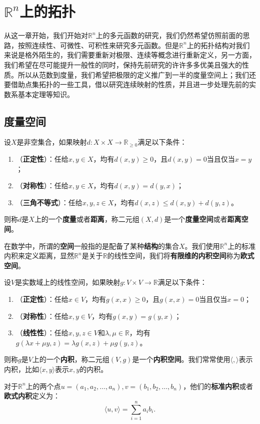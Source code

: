 \chapter{\(\mathbb{R}^n\)上的拓扑}
从这一章开始，我们开始对\(\mathbb{R}^n\)上的多元函数的研究，我们仍然希望仿照前面的思路，按照连续性、可微性、可积性来研究多元函数。但是\(\mathbb{R}^n\)上的拓扑结构对我们来说是格外陌生的，我们需要重新对极限、连续等概念进行重新定义，另一方面，我们希望在尽可能提升一般性的同时，保持先前研究的许许多多优美且强大的性质。所以从范数到度量，我们希望把极限的定义推广到一半的度量空间上；我们还要借助点集拓扑的一些工具，借以研究连续映射的性质，并且进一步处理先前的实数系基本定理等知识。

\section{度量空间}
\begin{definition}[度量]
    设\(X\)是非空集合，如果映射\(d:X\times X\rightarrow\mathbb{R}_{\geqslant0}\)满足以下条件：
    \begin{enumerate}
        \item （\textbf{正定性}）：任给\(x,y\in X\)，均有\(d(x,y)\geq 0\)，且\(d(x,y)=0\)当且仅当\(x=y\)；
        \item （\textbf{对称性}）：任给\(x,y\in X\)，均有\(d(x,y)=d(y,x)\)；
        \item （\textbf{三角不等式}）：任给\(x,y,z\in X\)，均有\(d(x,z)\leq d(x,y)+d(y,z)\)。
    \end{enumerate}
    则称\(d\)是\(X\)上的一个\textbf{度量}或者\textbf{距离}，称二元组\((X,d)\)是一个\textbf{度量空间}或者\textbf{距离空间}。
\end{definition}
在数学中，所谓的\textbf{空间}一般指的是配备了某种\textbf{结构}的集合\(X\)。我们使用\(\mathbb{R}^n\)上的标准内积来定义距离，显然\(\mathbb{R}^n\)是关于\(\mathbb{R}\)的线性空间，我们将\textbf{有限维的内积空间}称为\textbf{欧式空间}。
\begin{definition}[内积]
    设\(V\)是实数域上的线性空间，如果映射\(g:V\times V\rightarrow\mathbb{R}\)满足以下条件：
    \begin{enumerate}
        \item （\textbf{正定性}）：任给\(x\in V\)，均有\(g(x,x)\geq 0\)，且\(g(x,x)=0\)当且仅当\(x=0\)；
        \item （\textbf{对称性}）：任给\(x,y\in V\)，均有\(g(x,y)=g(y,x)\)；
        \item （\textbf{线性性}）：任给\(x,y,z\in V\)和\(\lambda,\mu\in\mathbb{R}\)，均有\(g(\lambda x+\mu y,z)=\lambda g(x,z)+\mu g(y,z)\)。
    \end{enumerate}
    则称\(g\)是\(V\)上的一个\textbf{内积}，称二元组\((V,g)\)是一个\textbf{内积空间}。我们常常使用\(\langle,\rangle\)表示内积，比如\(\langle x,y\rangle\)表示\(x,y\)的内积。

    对于\(\mathbb{R}^n\)上的两个点\(u=(a_1,a_2,\dots,a_n),v=(b_1,b_2,\dots,b_n)\)，他们的\textbf{标准内积}或者\textbf{欧式内积}定义为：\[\langle u,v\rangle= \sum_{i=1}^{n}a_ib_i.\]
\end{definition}
